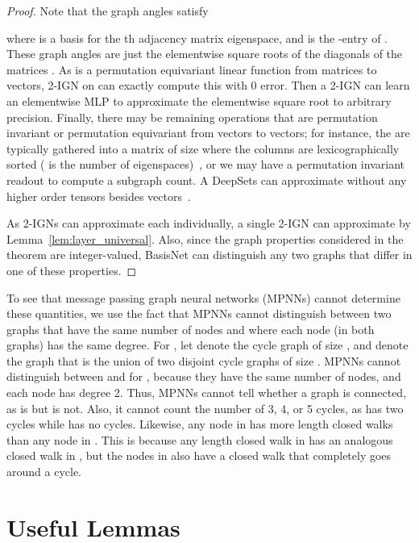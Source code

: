 \documentclass{article} \usepackage{iclr2023_conference,times}
\begin{document}
\begin{proof}
    Note that the graph angles satisfy 
    
    where  is a basis for the th adjacency matrix eigenspace, and  is the -entry of . These graph angles are just the elementwise square roots of the diagonals of the matrices . As  is a permutation equivariant linear function from matrices to vectors, 2-IGN on  can exactly compute this with 0 error. Then a 2-IGN can learn an elementwise MLP to approximate the elementwise square root  to arbitrary precision. Finally, there may be remaining operations  that are permutation invariant or permutation equivariant from vectors to vectors; for instance, the  are typically gathered into a matrix of size  where the columns are lexicographically sorted ( is the number of eigenspaces)~\citep{cvetkovic1997eigenspaces}, or we may have a permutation invariant readout to compute a subgraph count. A DeepSets can approximate  without any higher order tensors besides vectors~\citep{zaheer2017deep,segol2019universal}.

    As 2-IGNs can approximate each  individually, a single 2-IGN can approximate  by Lemma~\ref{lem:layer_universal}. 
    Also, since the graph properties considered in the theorem are integer-valued, BasisNet can distinguish any two graphs that differ in one of these properties.
\end{proof}

To see that message passing graph neural networks (MPNNs) cannot determine these quantities, we use the fact that MPNNs cannot distinguish between two graphs that have the same number of nodes and where each node (in both graphs) has the same degree. For , let  denote the cycle graph of size , and  denote the graph that is the union of two disjoint cycle graphs of size . MPNNs cannot distinguish between  and  for , because they have the same number of nodes, and each node has degree 2. Thus, MPNNs cannot tell whether a graph is connected, as  is but  is not. Also, it cannot count the number of 3, 4, or 5 cycles, as  has two  cycles while  has no  cycles. Likewise, any node in  has more length  closed walks than any node in . This is because any length  closed walk in  has an analogous closed walk in , but the nodes in  also have a closed walk that completely goes around a cycle.





\section{Useful Lemmas}
\end{document}
